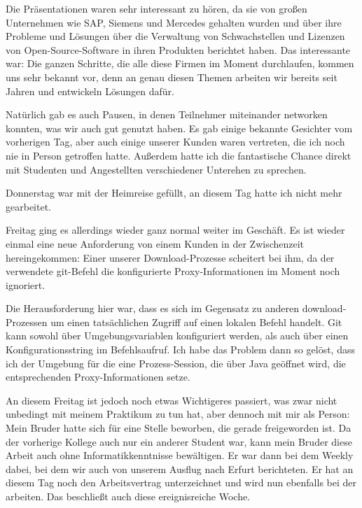 Die Präsentationen waren sehr interessant zu hören, da sie von großen Unternehmen wie SAP, Siemens und Mercedes gehalten wurden und über ihre Probleme und Lösungen über die Verwaltung von Schwachstellen und Lizenzen von Open-Source-Software in ihren Produkten berichtet haben.
Das interessante war: Die ganzen Schritte, die alle diese Firmen im Moment durchlaufen, kommen uns sehr bekannt vor, denn an genau diesen Themen arbeiten wir bereits seit Jahren und entwickeln Lösungen dafür.

Natürlich gab es auch Pausen, in denen Teilnehmer miteinander networken konnten, was wir auch gut genutzt haben.
Es gab einige bekannte Gesichter vom vorherigen Tag, aber auch einige unserer Kunden waren vertreten, die ich noch nie in Person getroffen hatte.
Außerdem hatte ich die fantastische Chance direkt mit Studenten und Angestellten verschiedener Unterehen zu sprechen.

Donnerstag war mit der Heimreise gefüllt, an diesem Tag hatte ich nicht mehr gearbeitet.

Freitag ging es allerdings wieder ganz normal weiter im Geschäft.
Es ist wieder einmal eine neue Anforderung von einem Kunden in der Zwischenzeit hereingekommen:
Einer unserer Download-Prozesse scheitert bei ihm, da der verwendete git-Befehl die konfigurierte Proxy-Informationen im Moment noch ignoriert.

Die Herausforderung hier war, dass es sich im Gegensatz zu anderen download-Prozessen um einen tatsächlichen Zugriff auf einen lokalen Befehl handelt.
Git kann sowohl über Umgebungsvariablen konfiguriert werden, als auch über einen Konfigurationsstring im Befehlsaufruf.
Ich habe das Problem dann so gelöst, dass ich der Umgebung für die eine Prozess-Session, die über Java geöffnet wird, die entsprechenden Proxy-Informationen setze.

An diesem Freitag ist jedoch noch etwas Wichtigeres passiert, was zwar nicht unbedingt mit meinem Praktikum zu tun hat, aber dennoch mit mir als Person:
Mein Bruder hatte sich für eine Stelle beworben, die gerade freigeworden ist.
Da der vorherige Kollege auch nur ein anderer Student war, kann mein Bruder diese Arbeit auch ohne Informatikkenntnisse bewältigen.
Er war dann bei dem Weekly dabei, bei dem wir auch von unserem Ausflug nach Erfurt berichteten.
Er hat an diesem Tag noch den Arbeitsvertrag unterzeichnet und wird nun ebenfalls bei der \metaeffekt arbeiten.
Das beschließt auch diese ereignisreiche Woche.
